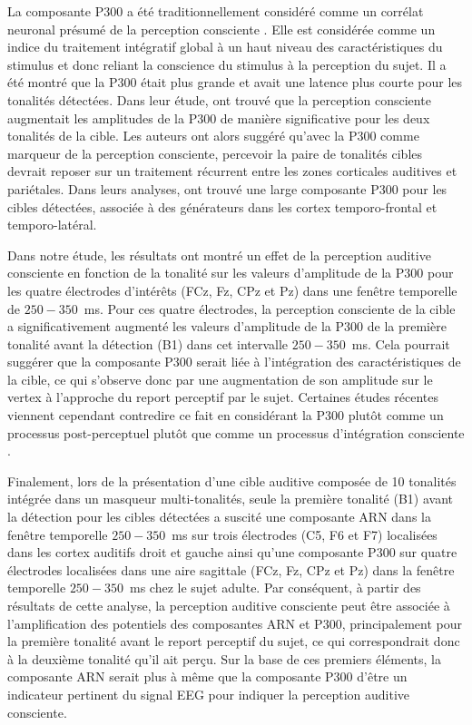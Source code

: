 La composante P300 a été traditionnellement considéré comme un corrélat neuronal présumé de la perception consciente \citep{dehaene2006conscious, del2007brain, sergent2004neural, sergent2005timing}. 
Elle est considérée comme un indice du traitement intégratif global à un haut niveau des caractéristiques du stimulus et donc reliant la conscience du stimulus à la perception du sujet. 
Il a été montré que la P300 était plus grande et avait une latence plus courte pour les tonalités détectées. 
Dans leur étude, \cite{giani2015detecting} ont trouvé que la perception consciente augmentait les amplitudes de la P300 de manière significative pour les deux tonalités de la cible. 
Les auteurs ont alors suggéré qu'avec la P300 comme marqueur de la perception consciente, percevoir la paire de tonalités cibles devrait reposer sur un traitement récurrent entre les zones corticales auditives et pariétales. 
Dans leurs analyses, \cite{dykstra2016neural} ont trouvé une large composante P300 pour les cibles détectées, associée à des générateurs dans les cortex temporo-frontal et temporo-latéral. 

Dans notre étude, les résultats ont montré un effet de la perception auditive consciente en fonction de la tonalité sur les valeurs d'amplitude de la P300 pour les quatre électrodes d'intérêts (FCz, Fz, CPz et Pz) dans une fenêtre temporelle de $250-350$~ms. 
Pour ces quatre électrodes, la perception consciente de la cible a significativement augmenté les valeurs d'amplitude de la P300 de la première tonalité avant la détection (B1) dans cet intervalle $250-350$~ms. 
Cela pourrait suggérer que la composante P300 serait liée à l'intégration des caractéristiques de la cible, ce qui s'observe donc par une augmentation de son amplitude sur le vertex à l'approche du report perceptif par le sujet. 
Certaines études récentes viennent cependant contredire ce fait en considérant la P300 plutôt comme un processus post-perceptuel plutôt que comme un processus d'intégration consciente \citep{cohen2020distinguishing, fishman2021learning, pitts2014gamma, pitts2014isolating, tsuchiya2015no}. 

Finalement, lors de la présentation d'une cible auditive composée de 10 tonalités intégrée dans un masqueur multi-tonalités, seule la première tonalité (B1) avant la détection pour les cibles détectées a suscité une composante ARN dans la fenêtre temporelle $250-350$~ms sur trois électrodes (C5, F6 et F7) localisées dans les cortex auditifs droit et gauche ainsi qu'une composante P300 sur quatre électrodes localisées dans une aire sagittale (FCz, Fz, CPz et Pz) dans la fenêtre temporelle $250-350$~ms chez le sujet adulte. 
Par conséquent, à partir des résultats de cette analyse, la perception auditive consciente peut être associée à l'amplification des potentiels des composantes ARN et P300, principalement pour la première tonalité avant le report perceptif du sujet, ce qui correspondrait donc à la deuxième tonalité qu'il ait perçu. 
Sur la base de ces premiers éléments, la composante ARN serait plus à même que la composante P300 d'être un indicateur pertinent du signal EEG pour indiquer la perception auditive consciente. 

